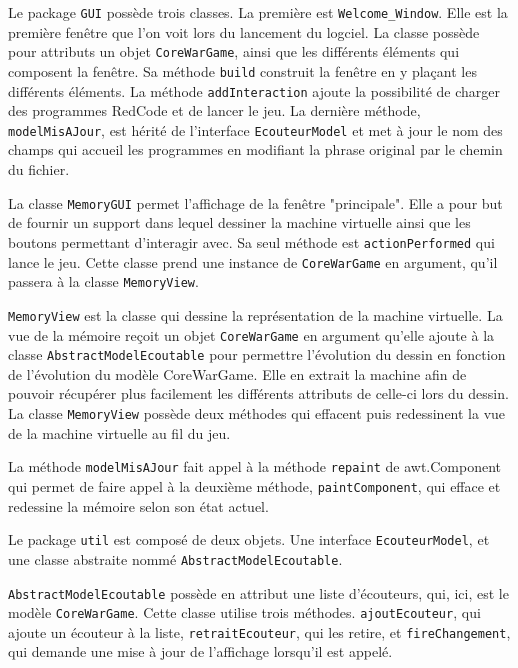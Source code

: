 \documentclass[hidelinks]{report}
\begin{document}
Le package \texttt{GUI} possède trois classes. La première est \texttt{Welcome\_Window}. Elle est la première fenêtre que l'on voit lors du lancement du logciel. La classe possède pour attributs un objet \texttt{CoreWarGame}, ainsi que les différents éléments qui composent la fenêtre. Sa méthode \texttt{build} construit la fenêtre en y plaçant les différents éléments. La méthode \texttt{addInteraction} ajoute la possibilité de charger des programmes RedCode et de lancer le jeu. La dernière méthode, \texttt{modelMisAJour}, est hérité de l'interface \texttt{EcouteurModel} et met à jour le nom des champs qui accueil les programmes en modifiant la phrase original par le chemin du fichier.

La classe \texttt{MemoryGUI} permet l'affichage de la fenêtre "principale". Elle a pour but de fournir un support dans lequel dessiner la machine virtuelle ainsi que les boutons permettant d'interagir avec. Sa seul méthode est \texttt{actionPerformed} qui lance le jeu. Cette classe prend une instance de  \texttt{CoreWarGame} en argument, qu'il passera à la classe \texttt{MemoryView}.

\texttt{MemoryView} est la classe qui dessine la représentation de la machine virtuelle. La vue de la mémoire reçoit un objet \texttt{CoreWarGame} en argument qu'elle ajoute à la classe \texttt{AbstractModelEcoutable} pour permettre l'évolution du dessin en fonction de l'évolution du modèle CoreWarGame. Elle en extrait la machine afin de pouvoir récupérer plus facilement les différents attributs de celle-ci lors du dessin. La classe \texttt{MemoryView} possède deux méthodes qui effacent puis redessinent la vue de la machine virtuelle au fil du jeu.

La méthode \texttt{modelMisAJour} fait appel à la méthode \texttt{repaint} de awt.Component qui permet de faire appel à la deuxième méthode,  \texttt{paintComponent}, qui efface et redessine la mémoire selon son état actuel.

Le package \texttt{util} est composé de deux objets. Une interface \texttt{EcouteurModel}, et une classe abstraite nommé \texttt{AbstractModelEcoutable}.

\texttt{AbstractModelEcoutable} possède en attribut une liste d'écouteurs, qui, ici, est le modèle \texttt{CoreWarGame}. Cette classe utilise trois méthodes. \texttt{ajoutEcouteur}, qui ajoute un écouteur à la liste, \texttt{retraitEcouteur}, qui les retire, et \texttt{fireChangement}, qui demande une mise à jour de l'affichage lorsqu'il est appelé.
\end{document}
